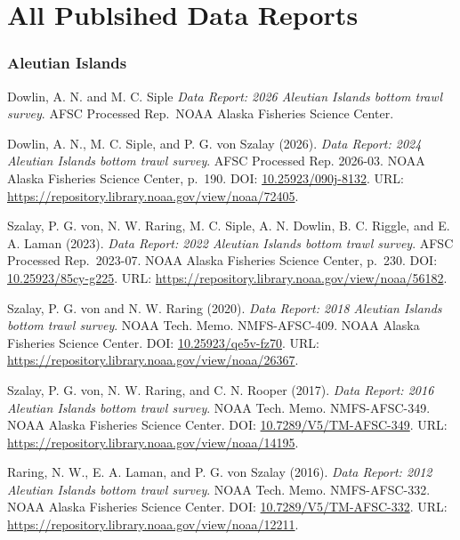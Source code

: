 \documentclass[
  letterpaper,
  oneside,
  open=any]{scrbook}
\begin{document}
\chapter{All Publsihed Data Reports}\label{all-publsihed-data-reports}

\subsection{Aleutian Islands}\label{aleutian-islands-1}

Dowlin, A. N. and M. C. Siple \emph{Data Report: 2026 Aleutian Islands
bottom trawl survey}. AFSC Processed Rep.~NOAA Alaska Fisheries Science
Center.

Dowlin, A. N., M. C. Siple, and P. G. von Szalay (2026). \emph{Data
Report: 2024 Aleutian Islands bottom trawl survey}. AFSC Processed Rep.
2026-03. NOAA Alaska Fisheries Science Center, p.~190. DOI:
\href{https://doi.org/10.25923\%2F090j-8132}{10.25923/090j-8132}. URL:
\url{https://repository.library.noaa.gov/view/noaa/72405}.

Szalay, P. G. von, N. W. Raring, M. C. Siple, A. N. Dowlin, B. C.
Riggle, and E. A. Laman (2023). \emph{Data Report: 2022 Aleutian Islands
bottom trawl survey}. AFSC Processed Rep.~2023-07. NOAA Alaska Fisheries
Science Center, p.~230. DOI:
\href{https://doi.org/10.25923\%2F85cy-g225}{10.25923/85cy-g225}. URL:
\url{https://repository.library.noaa.gov/view/noaa/56182}.

Szalay, P. G. von and N. W. Raring (2020). \emph{Data Report: 2018
Aleutian Islands bottom trawl survey}. NOAA Tech. Memo. NMFS-AFSC-409.
NOAA Alaska Fisheries Science Center. DOI:
\href{https://doi.org/10.25923\%2Fqe5v-fz70}{10.25923/qe5v-fz70}. URL:
\url{https://repository.library.noaa.gov/view/noaa/26367}.

Szalay, P. G. von, N. W. Raring, and C. N. Rooper (2017). \emph{Data
Report: 2016 Aleutian Islands bottom trawl survey}. NOAA Tech. Memo.
NMFS-AFSC-349. NOAA Alaska Fisheries Science Center. DOI:
\href{https://doi.org/10.7289\%2FV5\%2FTM-AFSC-349}{10.7289/V5/TM-AFSC-349}.
URL: \url{https://repository.library.noaa.gov/view/noaa/14195}.

Raring, N. W., E. A. Laman, and P. G. von Szalay (2016). \emph{Data
Report: 2012 Aleutian Islands bottom trawl survey}. NOAA Tech. Memo.
NMFS-AFSC-332. NOAA Alaska Fisheries Science Center. DOI:
\href{https://doi.org/10.7289\%2FV5\%2FTM-AFSC-332}{10.7289/V5/TM-AFSC-332}.
URL: \url{https://repository.library.noaa.gov/view/noaa/12211}.
\end{document}
